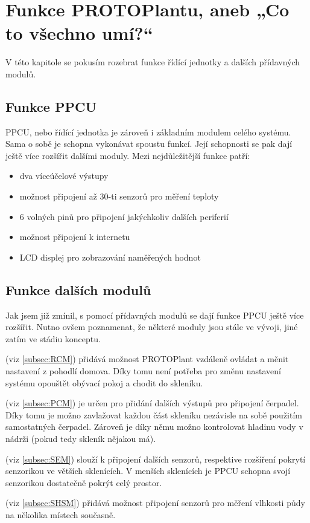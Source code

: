 \chapter{Funkce PROTOPlantu, aneb „Co to všechno umí?“}
V této kapitole se pokusím rozebrat funkce řídící jednotky a dalších přídavných modulů.

\section{Funkce PPCU}
PPCU, nebo řídící jednotka je zároveň i základním modulem celého systému.
Sama o sobě je schopna vykonávat spoustu funkcí.
Její schopnosti se pak dají ještě více rozšířit dalšími moduly.
Mezi nejdůležitější funkce patří:
\begin{itemize}
    \item dva víceúčelové výstupy
    \item možnost připojení až 30-ti senzorů pro měření teploty
    \item 6 volných pinů pro připojení jakýchkoliv dalších periferií
    \item možnost připojení k internetu
    \item LCD displej pro zobrazování naměřených hodnot
\end{itemize}

\section{Funkce dalších modulů}
Jak jsem již zmínil, s pomocí přídavných modulů se dají funkce PPCU ještě více rozšířit.
Nutno ovšem poznamenat, že některé moduly jsou stále ve vývoji, jiné zatím ve stádiu konceptu.
\newline

\noindent{} (viz \autoref{subsec:RCM}) přidává možnost PROTOPlant vzdáleně ovládat a měnit nastavení z pohodlí domova.
Díky tomu není potřeba pro změnu nastavení systému opouštět obývací pokoj a chodit do skleníku. \newline

\noindent{} (viz \autoref{subsec:PCM}) je určen pro přidání dalších výstupů pro připojení čerpadel.
Díky tomu je možno zavlažovat každou část skleníku nezávisle na sobě použitím samostatných čerpadel. 
Zároveň je díky němu možno kontrolovat hladinu vody v nádrži (pokud tedy skleník nějakou má).\newline

\noindent{} (viz \autoref{subsec:SEM}) slouží k připojení dalších senzorů, respektive rozšíření pokrytí senzorikou ve větších sklenících.
V menších sklenících je PPCU schopna svojí senzorikou dostatečně pokrýt celý prostor.\newline

\noindent{} (viz \autoref{subsec:SHSM}) přidává možnost připojení senzorů pro měření vlhkosti půdy na několika místech současně.\newline

\newpage